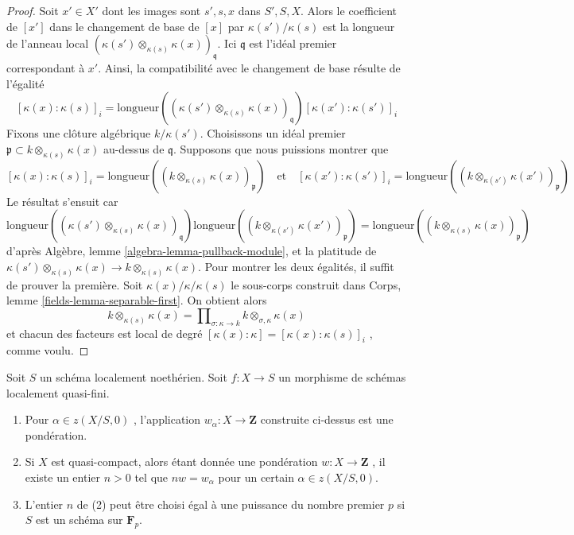 \begin{proof} 
Soit  $x' \in X'$  dont les images sont  $s', s, x$  dans  $S', S, X$.
 Alors le coefficient de  $[x']$  dans
 le changement de base de  $[x]$  par $\kappa(s')/\kappa(s)$  est la longueur de
 l'anneau local  $(\kappa(s') \otimes_{\kappa(s)} \kappa(x))_\mathfrak q$.
 Ici  $\mathfrak q$  est l'idéal premier correspondant à  $x'$. 
Ainsi, la compatibilité avec le changement de base résulte de l'égalité 
$$
[\kappa(x) : \kappa(s)]_i =
\text{longueur}((\kappa(s') \otimes_{\kappa(s)} \kappa(x))_\mathfrak q)
[\kappa(x') : \kappa(s')]_i
$$
 Fixons une clôture algébrique  $k/\kappa(s')$. Choisissons un idéal premier  
$\mathfrak p \subset k \otimes_{\kappa(s)} \kappa(x)$ au-dessus
 de  $\mathfrak q$. Supposons que nous puissions montrer que 
$$
[\kappa(x) : \kappa(s)]_i =
\text{longueur}((k \otimes_{\kappa(s)} \kappa(x))_\mathfrak p)
\quad\text{et}\quad
[\kappa(x') : \kappa(s')]_i =
\text{longueur}((k \otimes_{\kappa(s')} \kappa(x'))_\mathfrak p)
$$
 Le résultat s'ensuit car 
$$
\text{longueur}((\kappa(s') \otimes_{\kappa(s)} \kappa(x))_\mathfrak q)
\text{longueur}((k \otimes_{\kappa(s')} \kappa(x'))_\mathfrak p)
=
\text{longueur}((k \otimes_{\kappa(s)} \kappa(x))_\mathfrak p)
$$
 d'après Algèbre, lemme \ref{algebra-lemma-pullback-module}, et la platitude de  
$\kappa(s') \otimes_{\kappa(s)} \kappa(x) \to k \otimes_{\kappa(s)} \kappa(x)$.
 Pour montrer les deux égalités, il suffit de prouver la première. 
Soit  $\kappa(x)/\kappa/\kappa(s)$  le sous-corps construit dans
 Corps, lemme \ref{fields-lemma-separable-first}. On obtient alors 
$$
k \otimes_{\kappa(s)} \kappa(x) =
\prod\nolimits_{\sigma : \kappa \to k}
k \otimes_{\sigma, \kappa} \kappa(x)
$$
 et chacun des facteurs est local de degré  
$[\kappa(x) : \kappa] = [\kappa(x) : \kappa(s)]_i$
 , comme voulu. 
\end{proof} 

\begin{lemma} 
\label{lemma-weightings} 
Soit  $S$  un schéma localement noethérien. Soit  $f : X \to S$  un morphisme
 de schémas localement quasi-fini. 
\begin{enumerate} 
\item Pour  $\alpha \in z(X/S, 0)$ , l'application  $w_\alpha : X \to \mathbf{Z}$
  construite ci-dessus est une pondération. 
\item Si  $X$  est quasi-compact, alors étant donnée une pondération 
$w : X \to \mathbf{Z}$ , il existe un entier  $n > 0$  tel 
que  $nw = w_\alpha$  pour un certain  $\alpha \in z(X/S, 0)$. 
\item L'entier  $n$  de (2) peut être choisi égal à une puissance du 
nombre premier  $p$  si  $S$  est un schéma sur  $\mathbf{F}_p$. 
\end{enumerate} 
\end{lemma} 

